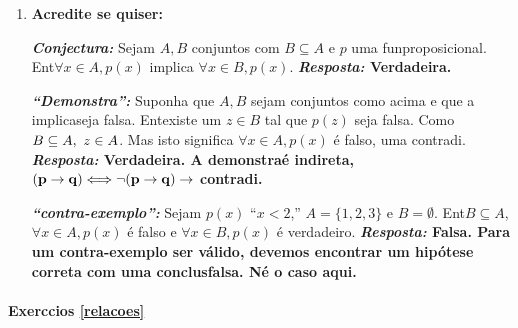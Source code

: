 \begin{enumerate}[{\bf 1.}]
\begin{enumerate}[a)]
\item $[\exists x\in D\ni p(x)\ee \exists x\in D\ni q(x)];[\exists x\in D\ni p(x)\ee q(x)]$.

{\bf{\it Resposta:} A primeira se\'a verdade quando ${\bf P\neq\emptyset}$ e ${\bf Q\neq\emptyset}$; a segunda ser\'a verdade quando ${\bf P\inter Q\neq\emptyset}$ . Certamente a segunda condi\cao implica a primeira. Se ${\bf D=\mathbb{N}}$, ${\bf p(x)}$, ${\bf p(x)}$ \'e ``${\bf x}$ \'e par'' e ${\bf q(x)}$ \'e ``${\bf x}$ \' \ih mpar'' ent\ao a primeira \'e verdade e a segunda \'e falsa.}

\item $[\exists x\in D\ni p(x)\to q(x)];[\exists x\in D\ni p(x) \to \exists x\in D\ni q(x)]$.
\end{enumerate}

\item {\bf Acredite se quiser:}  

\noindent \textit{\textbf{Conjectura:}} Sejam $A,B$ conjuntos com $B\subseteq A$ e $p$ uma fun\cao proposicional. Ent\ao $\forall x\in A, p(x)$ implica $\forall x\in B, p(x)$. {\bf{\it Resposta:} Verdadeira.}

\noindent \textit{\textbf{``Demonstra\caoi'':}} Suponha que $A,B$ sejam conjuntos como acima e que a implica\cao seja falsa. Ent\ao existe um $z\in B$ tal que $p(z)$ seja falsa. Como $B\subseteq A, \textrm{ } z\in A$. Mas isto significa $\forall x \in A, p(x)$ \'e falso, uma contradi\caoi. {\bf{\it Resposta:} Verdadeira. A demonstra\cao \'e indireta, ${\bf (p\to q) \Longleftrightarrow \lnot(p\to q)\to}$ contradi\caoi.}

\noindent \textit{\textbf{``contra-exemplo'':}} Sejam $p(x)$ ``$x<2$,'' $A=\{1,2,3\}$ e $B=\emptyset$. Ent\ao $B\subseteq A$, $\forall x \in A, p(x)$ \'e falso e $\forall x \in B, p(x)$ \'e verdadeiro. {\bf{\it Resposta:} Falsa. Para um contra-exemplo ser v\'alido, devemos encontrar um hip\'otese correta com uma conclus\ao falsa. N\ao \'e o caso aqui.}
\end{enumerate}
\paragraph{Exerc\ih cios \ref{relacoes}}

